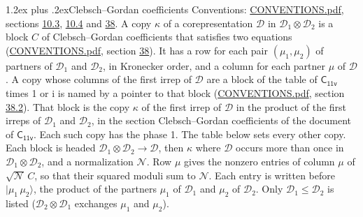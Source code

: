 \documentclass[10pt,a4paper]{article}
\makeatletter
\renewcommand\section{\@startsection{section}{1}{\z@}{-3ex plus -1ex minus -.2ex}%
  {1.2ex plus .2ex}{\normalfont\large\sffamily\bfseries\color{parttitle}}}
\numberwithin{equation}{section}
\newcommand{\grp}[1]{\mathsf{#1}}
\newcommand{\iunit}{\mathrm{i}}
\newcommand{\irrprod}{\otimes}
\newcommand{\mult}{\kappa}
\newcommand{\intx}{\mu}
\newcommand{\cgnorm}{\mathcal{N}}
\newcommand{\prodket}[2]{\lvert {#1}\,{#2}\rangle}
\makeatother
\begin{document}
\section{Clebsch--Gordan coefficients}\label{s:clebsch_gordan}
Conventions: \href{../../CONVENTIONS.pdf}{CONVENTIONS.pdf}, sections \href{../../../rotation/CONVENTIONS.pdf\#conv.10.3}{10.3}, \href{../../../rotation/CONVENTIONS.pdf\#conv.10.4}{10.4} and \href{../../CONVENTIONS.pdf\#conv.38}{38}.
\leavevmode\label{n:index.copy}\label{n:matrix.cg.stored}A copy $\mult$ of a corepresentation $\mathcal{D}$ in $\mathcal{D}_1\irrprod\mathcal{D}_2$ is a block $C$ of Clebsch--Gordan coefficients that satisfies two equations (\href{../../CONVENTIONS.pdf}{CONVENTIONS.pdf}, section \href{../../CONVENTIONS.pdf\#conv.38}{38}). \label{n:index.cg}It has a row for each pair $(\intx_1, \intx_2)$ of partners of $\mathcal{D}_1$ and $\mathcal{D}_2$, in Kronecker order, and a column for each partner $\intx$ of $\mathcal{D}$.
A copy whose columns of the first irrep of $\mathcal{D}$ are a block of the table of $\grp{C_{11v}}$ times 1 or $\iunit$ is named by a pointer to that block (\href{../../CONVENTIONS.pdf}{CONVENTIONS.pdf}, section \href{../../CONVENTIONS.pdf\#conv.38.2}{38.2}). That block is the copy $\mult$ of the first irrep of $\mathcal{D}$ in the product of the first irreps of $\mathcal{D}_1$ and $\mathcal{D}_2$, in the section Clebsch--Gordan coefficients of the document of \href{../../../rotation/data/pdf/C11v.pdf}{$\grp{C_{11v}}$}. Each such copy has the phase 1. The table below sets every other copy.
Each block is headed $\mathcal{D}_1\irrprod\mathcal{D}_2\to\mathcal{D}$, then $\mult$ where $\mathcal{D}$ occurs more than once in $\mathcal{D}_1\irrprod\mathcal{D}_2$, and a normalization $\cgnorm$. Row $\intx$ gives the nonzero entries of column $\intx$ of $\sqrt{\cgnorm}\,C$, so that their squared moduli sum to $\cgnorm$. \label{n:vector.ket.product}Each entry is written before $\prodket{\intx_1}{\intx_2}$, the product of the partners $\intx_1$ of $\mathcal{D}_1$ and $\intx_2$ of $\mathcal{D}_2$. Only $\mathcal{D}_1 \le \mathcal{D}_2$ is listed ($\mathcal{D}_2\irrprod\mathcal{D}_1$ exchanges $\intx_1$ and $\intx_2$).
\end{document}
